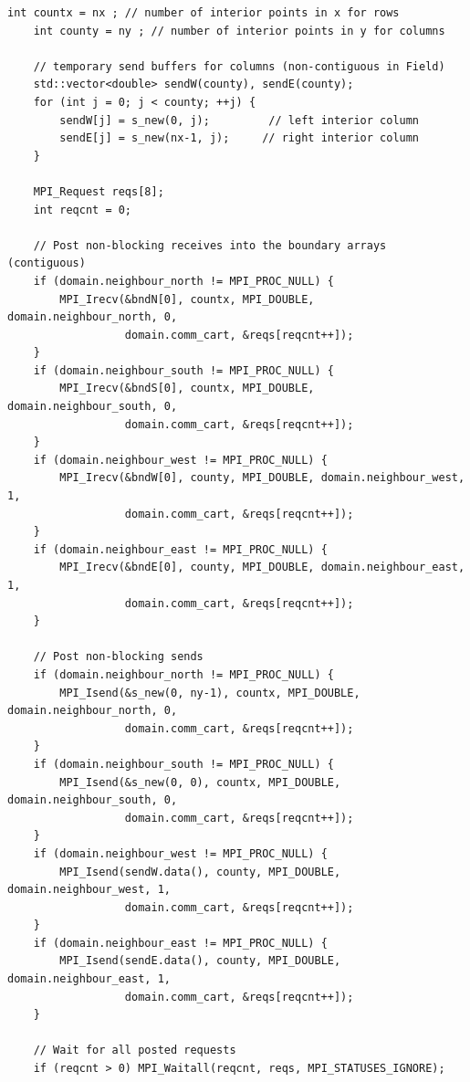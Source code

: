 \documentclass[unicode,10pt,a4paper,oneside,numbers=endperiod,openany]{scrartcl}
\begin{document}
\begin{lstlisting}[style=grayverbatim,label={lst:ghost_exchange},caption={Ghost cell exchange using non-blocking point-to-point communication}]
    int countx = nx ; // number of interior points in x for rows
    int county = ny ; // number of interior points in y for columns

    // temporary send buffers for columns (non-contiguous in Field)
    std::vector<double> sendW(county), sendE(county);
    for (int j = 0; j < county; ++j) {
        sendW[j] = s_new(0, j);         // left interior column
        sendE[j] = s_new(nx-1, j);     // right interior column
    }

    MPI_Request reqs[8];
    int reqcnt = 0;

    // Post non-blocking receives into the boundary arrays (contiguous)
    if (domain.neighbour_north != MPI_PROC_NULL) {
        MPI_Irecv(&bndN[0], countx, MPI_DOUBLE, domain.neighbour_north, 0,
                  domain.comm_cart, &reqs[reqcnt++]);
    }
    if (domain.neighbour_south != MPI_PROC_NULL) {
        MPI_Irecv(&bndS[0], countx, MPI_DOUBLE, domain.neighbour_south, 0,
                  domain.comm_cart, &reqs[reqcnt++]);
    }
    if (domain.neighbour_west != MPI_PROC_NULL) {
        MPI_Irecv(&bndW[0], county, MPI_DOUBLE, domain.neighbour_west, 1,
                  domain.comm_cart, &reqs[reqcnt++]);
    }
    if (domain.neighbour_east != MPI_PROC_NULL) {
        MPI_Irecv(&bndE[0], county, MPI_DOUBLE, domain.neighbour_east, 1,
                  domain.comm_cart, &reqs[reqcnt++]);
    }

    // Post non-blocking sends
    if (domain.neighbour_north != MPI_PROC_NULL) {
        MPI_Isend(&s_new(0, ny-1), countx, MPI_DOUBLE, domain.neighbour_north, 0,
                  domain.comm_cart, &reqs[reqcnt++]);
    }
    if (domain.neighbour_south != MPI_PROC_NULL) {
        MPI_Isend(&s_new(0, 0), countx, MPI_DOUBLE, domain.neighbour_south, 0,
                  domain.comm_cart, &reqs[reqcnt++]);
    }
    if (domain.neighbour_west != MPI_PROC_NULL) {
        MPI_Isend(sendW.data(), county, MPI_DOUBLE, domain.neighbour_west, 1,
                  domain.comm_cart, &reqs[reqcnt++]);
    }
    if (domain.neighbour_east != MPI_PROC_NULL) {
        MPI_Isend(sendE.data(), county, MPI_DOUBLE, domain.neighbour_east, 1,
                  domain.comm_cart, &reqs[reqcnt++]);
    }

    // Wait for all posted requests
    if (reqcnt > 0) MPI_Waitall(reqcnt, reqs, MPI_STATUSES_IGNORE);
\end{lstlisting}
\end{document}
